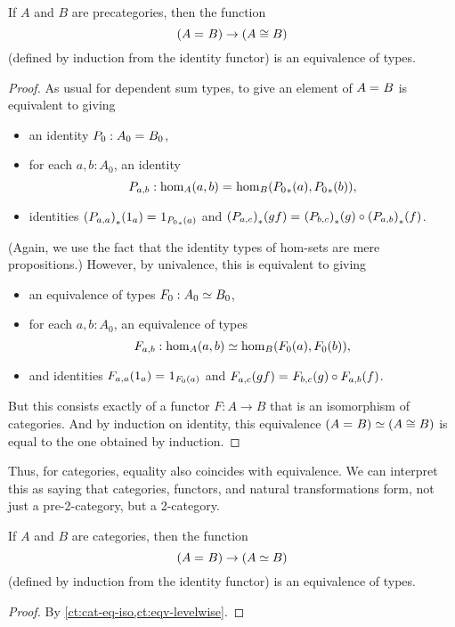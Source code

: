 \begin{lem}\label{ct:cat-eq-iso}
  If $A$ and $B$ are precategories, then the function
  \[(A =_{} B) \to (A\cong B)\]
  (defined by induction from the identity functor) is an equivalence of types.
\end{lem}
\begin{proof}
  As usual for dependent sum types, to give an element of $A =_{} B$ is equivalent to giving
  \begin{itemize}
  \item an identity $P_0:A_0 =_{} B_0$,
  \item for each $a,b:A_0$, an identity
    \[P_{a,b}:\hom_A(a,b) =_{} \hom_B({P_0}_{*}\mathopen{}\left({a}\right)\mathclose{},{P_0}_{*}\mathopen{}\left({b}\right)\mathclose{}),\]
  \item identities ${(P_{a,a})}_{*}\mathopen{}\left({1_a}\right)\mathclose{} =_{} 1_{{P_0}_{*}\mathopen{}\left({a}\right)\mathclose{}}$ and ${(P_{a,c})}_{*}\mathopen{}\left({gf}\right)\mathclose{} =_{} {(P_{b,c})}_{*}\mathopen{}\left({g}\right)\mathclose{} \circ {(P_{a,b})}_{*}\mathopen{}\left({f}\right)\mathclose{}$.
  \end{itemize}
  (Again, we use the fact that the identity types of hom-sets are mere propositions.)
  However, by univalence, this is equivalent to giving
  \begin{itemize}
  \item an equivalence of types $F_0:A_0 \simeq B_0$,
  \item for each $a,b:A_0$, an equivalence of types
    \[F_{a,b}:\hom_A(a,b) \simeq \hom_B(F_0 (a),F_0 (b)),\]
  \item and identities $F_{a,a}(1_a) =_{} 1_{F_0 (a)}$ and $F_{a,c}(gf) =_{} F_{b,c} (g)\circ F_{a,b} (f)$.
  \end{itemize}
  But this consists exactly of a functor $F:A\to B$ that is an isomorphism of categories.
  And by induction on identity, this equivalence $(A =_{} B) \simeq (A\cong B)$ is equal to the one obtained by induction.
\end{proof}

Thus, for categories, equality also coincides with equivalence.
We can interpret this as saying that categories, functors, and natural transformations form, not just a pre-2-category, but a 2-category.

\begin{thm}\label{ct:cat-2cat}
  If $A$ and $B$ are categories, then the function
  \[(A =_{} B) \to (A\simeq B)\]
  (defined by induction from the identity functor) is an equivalence of types.
\end{thm}
\begin{proof}
  By \autoref{ct:cat-eq-iso,ct:eqv-levelwise}.
\end{proof}


